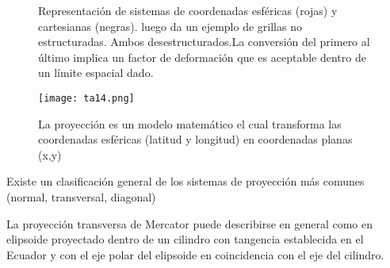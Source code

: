 \begin{figure}[ht!]
	\caption[Representación de grillas computacionales esféricas y regulares utilizadas por SWAN]
     {Representación de sistemas de coordenadas esféricas (rojas) y cartesianas (negras). luego
     da un ejemplo de grillas no estructuradas. Ambos desestructurados.La conversión del primero al último implica un factor de deformación que es aceptable dentro de un límite espacial dado.}
\end{figure}

\begin{figure}[h!]
  \centerline{\texttt{[image: ta14.png]}}
  \caption{La proyección es un modelo matemático el cual transforma las coordenadas esféricas (latitud y longitud) en coordenadas planas (x,y) }
  \label{ta14}
\end{figure}

Existe un clasificación general de los sistemas de proyección más comunes (normal, transversal, diagonal)

La proyección transversa de Mercator puede describirse en general como en elipsoide proyectado dentro de un cilindro con tangencia establecida en el Ecuador y con el eje polar del elipsoide en coincidencia con el eje del cilindro.

